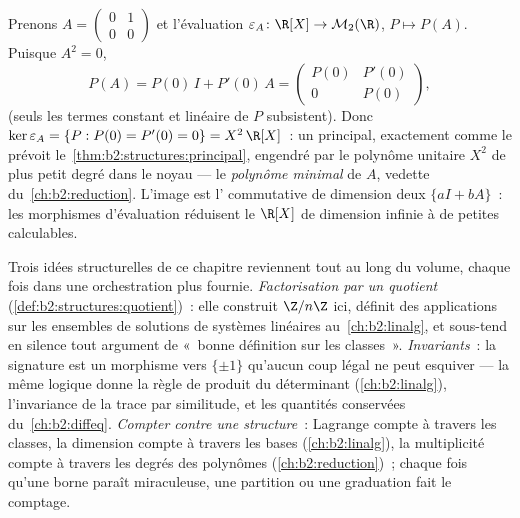\begin{example}\label{ex:b2:structures:evaluation}
Prenons $A = \begin{pmatrix}0 & 1\\ 0 & 0\end{pmatrix}$ et
l'évaluation $\varepsilon_A \colon \R[X] \to \mathcal{M}_2(\R)$,
$P \mapsto P(A)$. Puisque $A^2 = 0$,
\[
P(A) = P(0)\,I + P'(0)\,A =
\begin{pmatrix} P(0) & P'(0)\\ 0 & P(0)\end{pmatrix},
\]
(seuls les termes constant et linéaire de $P$ subsistent). Donc
$\ker\varepsilon_A = \{P : P(0) = P'(0) = 0\} = X^2\,\R[X]$~: un
 principal, exactement comme le prévoit
le~\cref{thm:b2:structures:principal}, engendré par le polynôme
unitaire $X^2$ de plus petit degré dans le noyau --- le
\emph{polynôme minimal} de $A$, vedette du~\cref{ch:b2:reduction}.
L'image est l' commutative de dimension deux $\{aI + bA\}$~:
les morphismes d'évaluation réduisent le $\R[X]$ de dimension
infinie à de petites  calculables.
\end{example}

\begin{remark}\label{rem:b2:structures:perspectives}
Trois idées structurelles de ce chapitre reviennent tout au long du
volume, chaque fois dans une orchestration plus fournie.
\emph{Factorisation par un quotient}
(\cref{def:b2:structures:quotient})~: elle construit $\Z/n\Z$ ici,
définit des applications sur les ensembles de solutions de systèmes
linéaires au~\cref{ch:b2:linalg}, et sous-tend en silence tout
argument de «~bonne définition sur les classes~». \emph{Invariants}~:
la signature est un morphisme vers $\{\pm1\}$ qu'aucun coup légal ne
peut esquiver --- la même logique donne la règle de produit du
déterminant (\cref{ch:b2:linalg}), l'invariance de la trace par
similitude, et les quantités conservées du~\cref{ch:b2:diffeq}.
\emph{Compter contre une structure}~: Lagrange compte à travers les
classes, la dimension compte à travers les bases
(\cref{ch:b2:linalg}), la multiplicité compte à travers les degrés
des polynômes (\cref{ch:b2:reduction})~; chaque fois qu'une borne
paraît miraculeuse, une partition ou une graduation fait le comptage.
\end{remark}

